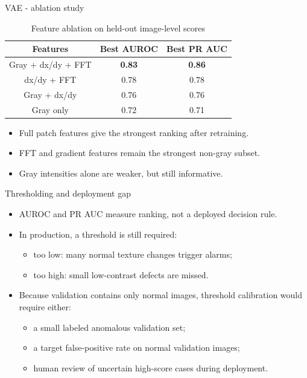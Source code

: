 \documentclass{beamer}
\begin{document}
\begin{frame}{VAE - ablation study}
    \begin{table}
        \centering
        \footnotesize
        \begin{tabular}{|c|c|c|}
        \hline
            Features & Best AUROC & Best PR AUC\\
        \hline
            Gray + dx/dy + FFT & \textbf{0.83} & \textbf{0.86}\\
        \hline
            dx/dy + FFT & 0.78 & 0.78\\
        \hline
            Gray + dx/dy & 0.76 & 0.76\\
        \hline
            Gray only & 0.72 & 0.71\\
        \hline
        \end{tabular}
        \caption{Feature ablation on held-out image-level scores}
    \end{table}
    \begin{itemize}
        \item Full patch features give the strongest ranking after retraining.
        \item FFT and gradient features remain the strongest non-gray subset.
        \item Gray intensities alone are weaker, but still informative.
    \end{itemize}
\end{frame}

\begin{frame}{Thresholding and deployment gap}
    \begin{itemize}
        \item AUROC and PR AUC measure ranking, not a deployed decision rule.
        \item In production, a threshold is still required:
        \begin{itemize}
            \item too low: many normal texture changes trigger alarms;
            \item too high: small low-contrast defects are missed.
        \end{itemize}
        \item Because validation contains only normal images, threshold calibration would require either:
        \begin{itemize}
            \item a small labeled anomalous validation set;
            \item a target false-positive rate on normal validation images;
            \item human review of uncertain high-score cases during deployment.
        \end{itemize}
    \end{itemize}
\end{frame}
\end{document}
